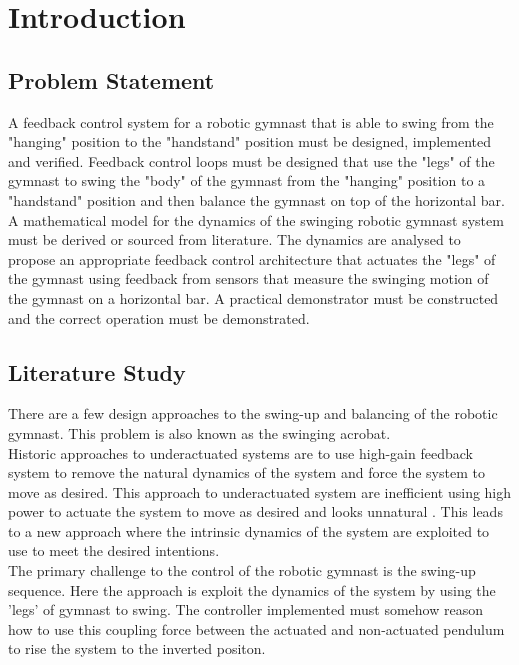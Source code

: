 \chapter{Introduction}
\label{chp:intro}


\section{Problem Statement}

A feedback control system for a robotic gymnast that is able to swing from the "hanging" position to the "handstand" position must be designed, implemented and verified. Feedback control loops must be designed that use the "legs" of the gymnast to swing the "body" of the gymnast from the "hanging" position to a "handstand" position and then balance the gymnast on top of the horizontal bar. A mathematical model for the dynamics of the swinging robotic gymnast system must be derived or sourced from literature. The dynamics are analysed to propose an appropriate feedback control architecture that actuates the "legs" of the gymnast using feedback from sensors that measure the swinging motion of the gymnast on a horizontal bar. A practical demonstrator must be constructed and the correct operation must be demonstrated.\\


\section{Literature Study}


There are a few design approaches to the swing-up and balancing of the robotic gymnast. This problem is also known as the swinging acrobat. \\

Historic approaches to underactuated systems are to use high-gain feedback system to remove the natural dynamics of the system and force the system to move as desired. This approach to underactuated system are inefficient using high power to actuate the system to move as desired and looks unnatural \citep{tedrake}. This leads to a new approach where the intrinsic dynamics of the system are exploited to use to meet the desired intentions.\\

The primary challenge to the control of the robotic gymnast is the swing-up sequence. Here the approach is exploit the dynamics of the system by using the 'legs' of gymnast to swing. The controller implemented must somehow reason how to use this coupling force between the actuated and non-actuated pendulum to rise the system to the inverted positon.\\

